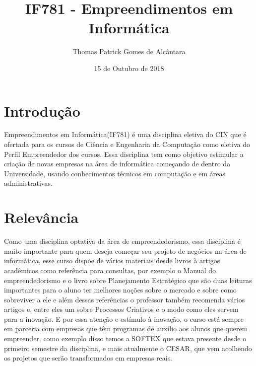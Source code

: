 \documentclass[a4paper]{article}
\title{IF781 - Empreendimentos em Informática}
\author{Thomas Patrick Gomes de Alcântara }
\date{15 de Outubro de 2018}
\begin{document}
\maketitle

\section{Introdução}
Empreendimentos em Informática(IF781) é uma disciplina eletiva do CIN que é ofertada para os cursos de Ciência e Engenharia da Computação como eletiva do Perfil Empreendedor dos cursos. Essa disciplina tem como objetivo estimular a criação de novas empresas na área de informática começando de dentro da Universidade, usando conhecimentos técnicos em computação e em áreas administrativas.


\section{Relevância}
Como uma disciplina optativa da área de empreendedorismo, essa disciplina é muito importante para quem deseja começar seu projeto de negócios na área de informática, esse curso dispõe de vários materiais desde livros à artigos acadêmicos como referência para consultas, por exemplo o Manual do empreendedorismo \cite{Manual} e o livro sobre Planejamento Estratégico \cite{Planejamento} que são duas leituras importantes para o aluno ter melhores noções sobre o mercado e sobre como sobreviver a ele e além dessas referências o professor também recomenda vários artigos e, entre eles um sobre Processos Criativos e o modo como eles servem para a inovação.\cite{Inovacao} E por essa atenção e estímulo à inovação, o curso está sempre em parceria com empresas que têm programas de auxílio aos alunos que querem empreender, como exemplo disso temos a SOFTEX que estava presente desde o primeiro semestre da disciplina, e mais atualmente o CESAR, que vem acolhendo os projetos que serão transformados em empresas reais. 
\end{document}
